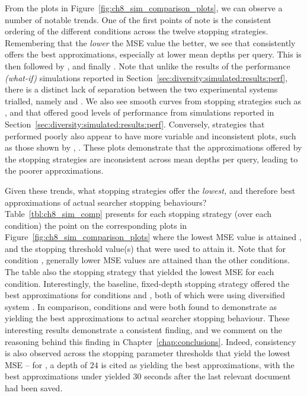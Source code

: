 From the plots in Figure~\ref{fig:ch8_sim_comparison_plots}, we can observe a number of notable trends. One of the first points of note is the consistent ordering of the different conditions across the twelve stopping strategies. Remembering that the \emph{lower} the MSE value the better, we see that  consistently offers the best approximations, especially at lower mean depths per query. This is then followed by ,  and finally . Note that unlike the results of the performance \emph{(what-if)} simulations reported in Section~\ref{sec:diversity:simulated:results:perf}, there is a distinct lack of separation between the two experimental systems trialled, namely  and . We also see smooth curves from stopping strategies such as ,  and  that offered good levels of performance from simulations reported in Section~\ref{sec:diversity:simulated:results:perf}. Conversely, strategies that performed poorly also appear to have more variable and inconsistent plots, such as those shown by , . These plots demonstrate that the approximations offered by the stopping strategies are inconsistent across mean depths per query, leading to the poorer approximations.

Given these trends, what stopping strategies offer the \emph{lowest,} and therefore best approximations of actual searcher stopping behaviours? Table~\ref{tbl:ch8_sim_comp} presents for each stopping strategy (over each condition) the point on the corresponding plots in Figure~\ref{fig:ch8_sim_comparison_plots} where the lowest MSE value is attained , and the stopping threshold value(s)  that were used to attain it. Note that for condition , generally lower MSE values are attained than the other conditions. The table also  the stopping strategy that yielded the lowest MSE for each condition. Interestingly, the baseline, fixed-depth stopping strategy  offered the best approximations for conditions  and , both of which were using diversified system . In comparison, conditions  and  were both found to demonstrate  as yielding the best approximations to actual searcher stopping behaviour. These interesting results demonstrate a consistent finding, and we comment on the reasoning behind this finding in Chapter~\ref{chap:conclusions}. Indeed, consistency is also observed across the stopping parameter thresholds that yield the lowest MSE -- for , a depth of $24$ is cited as yielding the best approximations, with the best approximations under  yielded $30$ seconds after the last relevant document had been saved.

